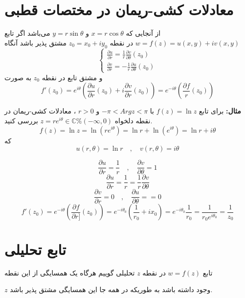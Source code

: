 \documentclass[12pt]{report}
\begin{document}
 	 	 	  \section{معادلات کشی-ریمان در مختصات قطبی}
 	 	 	  از آنجایی که
 	 	 	  $x = r\cos \theta$
 	 	 	  و
 	 	 	  $y = r\sin \theta$
 	 	 	  می‌باشد اگر تابع 
 	 	 	  $w = f(z) =u(x, y) + iv(x, y)$
 	 	 	  در نقطه 
 	 	 	  $z_0 = x_0 + iy_0$
 	 	 	  مشتق پذیر باشد آنگاه
 	 	 	  \[
 	 	 	  \begin{cases}
 	 	 	  	\frac{\partial u}{\partial r} = \frac{1}{r} \frac{\partial v}{\partial \theta} (z_0)\\
 	 	 	  	\frac{\partial v}{\partial r} = -\frac{1}{r} \frac{\partial u}{\partial \theta} (z_0)
 	 	 	  	
 	 	 	  \end{cases}
 	 	 	  \] 
 	 	 	  و مشتق تابع در نقطه 
 	 	 	  $z_0$
 	 	 	  به صورت 
 	 	 	  $$f'(z_0) = e^{i \theta}(\frac{\partial u}{\partial r}(z_0) + i\frac{\partial v}{\partial r}(z_0)) = e^{-i\theta}(\frac{\partial f}{r}(z_0))$$
 	 	 	  
 	 	 	  
 	 	 	  \textbf{مثال:}
 	 	 	  برای تابع
 	 	 	  $f(z) = \ln z$
 	 	 	  با
 	 	 	  $-\pi < Arg z < \pi$
 	 	 	  و 
 	 	 	  $r>0$
 	 	 	  ،
 	 	 	  معادلات کشی-ریمان در نقطه دلخواه
 	 	 	  $z = re^{i\theta} \in \mathbb{C} \% (-\infty ,  0)$
 	 	 	  بررسی کنید.
 	 	 	  $$f(z) = \ln z = \ln (re^{i\theta}) = \ln r + \ln (e^{i\theta}) = \ln r + i\theta$$
 	 	 	  که
 	 	 	  $$u(r, \theta) = \ln r \quad , \quad v(r, \theta) = i\theta$$
 	 	 	  
 	 	 	  $$\frac{\partial u}{\partial r} = \frac{1}{r} \quad, \quad \frac{\partial v}{\partial \theta} = 1$$
 	 	 	  $$\frac{\partial u}{\partial r} = \frac{1}{r} = \frac{1}{r} \frac{\partial v}{\partial \theta} $$
 	 	 	  $$\frac{\partial v}{\partial r} = 0 \quad , \quad \frac{\partial u}{\partial \theta} = = 0$$
 	 	 	  $$f'(z_0) = e^{-i\theta}(\frac{\partial f}{\partial r]}(z_0)) = e^{-i \theta_0}(\frac{1}{r_0} + ix_0) = e^{-i \theta_0} \frac{1}{r_0} = \frac{1}{r_0e^{i\theta_0}} = \frac{1}{z_0}$$
 	 	 	  
 	 	 	  \section{تابع تحلیلی}
 	 	 	  تابع 
 	 	 	  $w= f(z)$
 	 	 	  در نقطه 
 	 	 	  $z$
 	 	 	  تحلیلی گوییم هرگاه یک همسایگی از این نقطه 
 	 	 	  
 	 	 	  $z$
 	 	 	  وجود داشته باشد به طوریکه در همه جا این همسایگی مشتق پذیر باشد.
 	 	 	  
\end{document}
